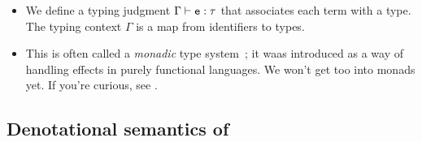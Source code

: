 \documentclass{tufte-handout}
\begin{document}
\begin{itemize}
\item We define a typing judgment $\Gamma \vdash \texttt{e} : \tau$ that associates each 
term with a type. The typing context $\Gamma$ is a map from identifiers to types.

\item This is often called a \emph{monadic} type
system~\citep{moggi1991notions}; it waas introduced as a way of handling effects
in purely functional languages. We won't get too into monads yet. If 
you're curious, see \citet{ramsey2002stochastic}.

\end{itemize}



\subsection{Denotational semantics of \disc{}}
\end{document}
